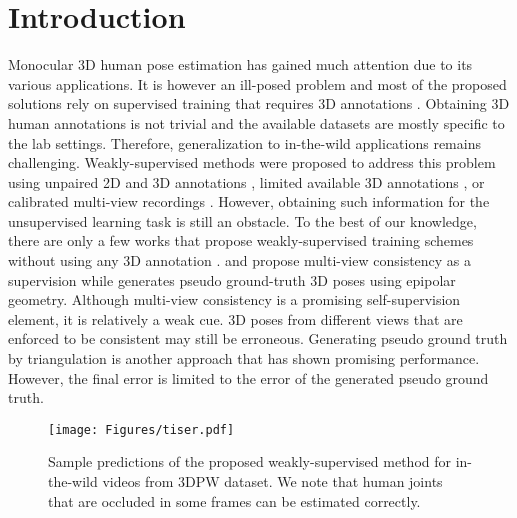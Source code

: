 \documentclass[10pt,twocolumn,letterpaper]{article}
\begin{document}
\section{Introduction}
Monocular 3D human pose estimation has gained much attention due to its various applications. It is however an ill-posed problem and most of the proposed solutions rely on supervised training that requires 3D annotations \cite{Martinez_2017_ICCV, pavlakos2018learning, Hossain_2018_ECCV, Sun_2018_ECCV, Chen_2017_CVPR, Kolotouros_2019_ICCV, Pavlakos_2018_CVPR, Pavlakos_2017_CVPR}. Obtaining 3D human annotations is not trivial and the available datasets are mostly specific to the lab settings. Therefore, generalization to in-the-wild applications remains challenging. Weakly-supervised methods were proposed to address this problem using unpaired 2D and 3D annotations \cite{Wandt_2019_CVPR, Wang_2019_ICCV, Kundu_2020_CVPR}, limited available 3D annotations \cite{Rhodin_2018_CVPR, Pavllo_2019_CVPR}, or calibrated multi-view recordings \cite{rhodin2018unsupervised, Rhodin_2018_CVPR}. However, obtaining such information for the unsupervised learning task is still an obstacle. To the best of our knowledge, there are only a few works that propose weakly-supervised training schemes without using any 3D annotation \cite{Kocabas_2019_CVPR, Iqbal_2020_CVPR, wandt2020canonpose, Wang_2019_ICCV}. \cite{Iqbal_2020_CVPR} and \cite{wandt2020canonpose} propose multi-view consistency as a supervision while \cite{Kocabas_2019_CVPR} generates pseudo ground-truth 3D poses using epipolar geometry. Although multi-view consistency is a promising self-supervision element, it is relatively a weak cue. 3D poses from different views that are enforced to be consistent may still be erroneous. Generating pseudo ground truth \cite{Kocabas_2019_CVPR} by triangulation is another approach that has shown promising performance. However, the final error is limited to the error of the generated pseudo ground truth. 
\begin{figure}[t]
\begin{center}
\texttt{[image: Figures/tiser.pdf]}
\end{center}
  \caption{Sample predictions of the proposed weakly-supervised method for in-the-wild videos from 3DPW dataset. We note that human joints that are occluded in some frames can be estimated correctly.}
\label{fig:tiser}
\end{figure}
\end{document}
